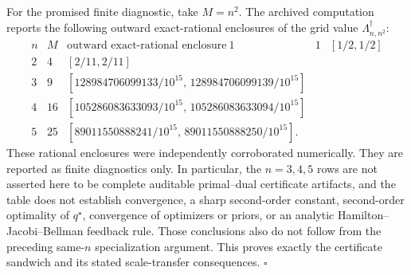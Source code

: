 For the promised finite diagnostic, take \(M=n^2\).  The archived computation reports the following outward exact-rational enclosures of the grid value \(\Lambda_{n,n^2}^\dagger\):
\[
\begin{array}{c|c|c}
n&M&\text{outward exact-rational enclosure}\ \hline
1&1&[1/2,1/2]\\
2&4&[2/11,2/11]\\
3&9&[128984706099133/10^{15},\,128984706099139/10^{15}]\\
4&16&[105286083633093/10^{15},\,105286083633094/10^{15}]\\
5&25&[89011550888241/10^{15},\,89011550888250/10^{15}].
\end{array}
\]
These rational enclosures were independently corroborated numerically.  They are reported as finite diagnostics only.  In particular, the \(n=3,4,5\) rows are not asserted here to be complete auditable primal--dual certificate artifacts, and the table does not establish convergence, a sharp second-order constant, second-order optimality of \(q^\star\), convergence of optimizers or priors, or an analytic Hamilton--Jacobi--Bellman feedback rule.  Those conclusions also do not follow from the preceding same-\(n\) specialization argument.  This proves exactly the certificate sandwich and its stated scale-transfer consequences. \(\square\)